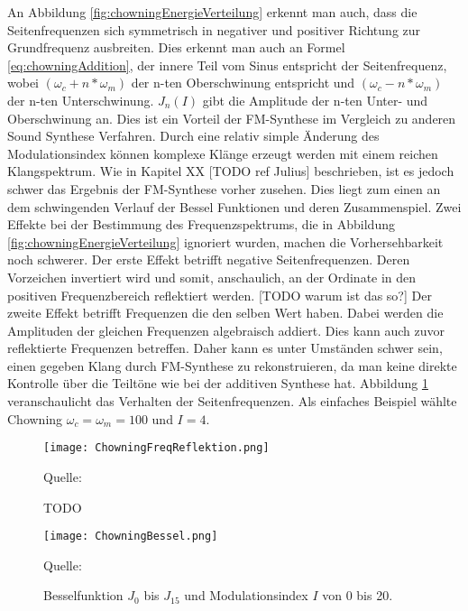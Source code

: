 An Abbildung \ref{fig:chowningEnergieVerteilung} erkennt man auch, dass die Seitenfrequenzen sich symmetrisch in negativer und positiver Richtung zur Grundfrequenz ausbreiten. Dies erkennt man auch an Formel \ref{eq:chowningAddition}, der innere Teil vom Sinus entspricht der Seitenfrequenz, wobei $(\omega_c+n*\omega_m)$ der n-ten Oberschwinung entspricht und $(\omega_c-n*\omega_m)$ der n-ten Unterschwinung. $J_n(I)$ gibt die Amplitude der n-ten Unter- und Oberschwinung an. Dies ist ein Vorteil der FM-Synthese im Vergleich zu anderen Sound Synthese Verfahren. Durch eine relativ simple Änderung des Modulationsindex können komplexe Klänge erzeugt werden mit einem reichen Klangspektrum. 
Wie in Kapitel XX [TODO ref Julius] beschrieben, ist es jedoch schwer das Ergebnis der FM-Synthese vorher zusehen. Dies liegt zum einen an dem schwingenden Verlauf der Bessel Funktionen und deren Zusammenspiel. Zwei Effekte bei der Bestimmung des Frequenzspektrums, die in Abbildung \ref{fig:chowningEnergieVerteilung} ignoriert wurden, machen die Vorhersehbarkeit noch schwerer. Der erste Effekt betrifft negative Seitenfrequenzen. Deren Vorzeichen invertiert wird und somit, anschaulich, an der Ordinate in den positiven Frequenzbereich reflektiert werden. [TODO warum ist das so?] Der zweite Effekt betrifft Frequenzen die den selben Wert haben. Dabei werden die Amplituden der gleichen Frequenzen algebraisch addiert. Dies kann auch zuvor reflektierte Frequenzen betreffen. Daher kann es unter Umständen schwer sein, einen gegeben Klang durch FM-Synthese zu rekonstruieren, da man keine direkte Kontrolle über die Teiltöne wie bei der additiven Synthese hat. Abbildung \ref{fig:chowningFreqReflektion} veranschaulicht das Verhalten der Seitenfrequenzen. Als einfaches Beispiel wählte Chowning $\omega_c=\omega_m=100$ und $I=4$.


\begin{figure} [ht]
\centering
  \texttt{[image: ChowningFreqReflektion.png]}
\caption{TODO}
\label{fig:chowningFreqReflektion}
Quelle: \cite{chowningPaper}
\end{figure}
\FloatBarrier





\begin{figure} [ht]
\centering
  \texttt{[image: ChowningBessel.png]}
\caption{Besselfunktion $J_0$ bis $J_{15}$ und Modulationsindex $I$ von 0 bis 20. }
\label{fig:bessel3D}
Quelle: \cite{chowningPaper}
\end{figure}



